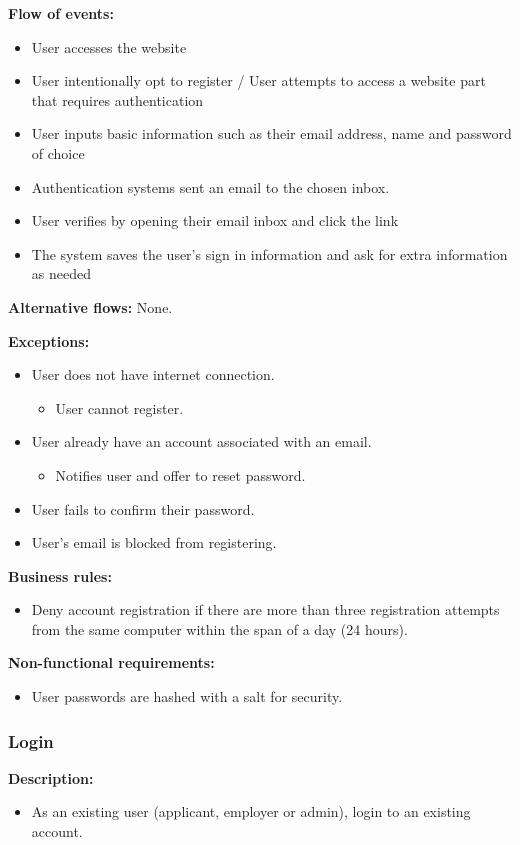 \documentclass[a4paper]{article}
\begin{document}
\textbf{Flow of events:}
\begin{itemize}
  \item User accesses the website
  \item User intentionally opt to register / User attempts to access a website part that requires authentication
  \item User inputs basic information such as their email address, name and password of choice
  \item Authentication systems sent an email to the chosen inbox.
  \item User verifies by opening their email inbox and click the link
  \item The system saves the user's sign in information and ask for extra information as needed
\end{itemize}

\textbf{Alternative flows:}
None.

\textbf{Exceptions:}
\begin{itemize}
  \item User does not have internet connection.
    \begin{itemize}
      \item User cannot register.
    \end{itemize}
  \item User already have an account associated with an email.
    \begin{itemize}
      \item Notifies user and offer to reset password.
    \end{itemize}
  \item User fails to confirm their password.
  \item User's email is blocked from registering.
\end{itemize}

\textbf{Business rules:}
\begin{itemize}
  \item Deny account registration if there are more than three registration attempts from the same computer within the span of a day (24 hours).
\end{itemize}

\textbf{Non-functional requirements:}
\begin{itemize}
  \item User passwords are hashed with a salt for security.
\end{itemize}

\subsubsection{Login}
\textbf{Description:}
\begin{itemize}
  \item As an existing user (applicant, employer or admin), login to an existing account.
\end{itemize}
\end{document}
